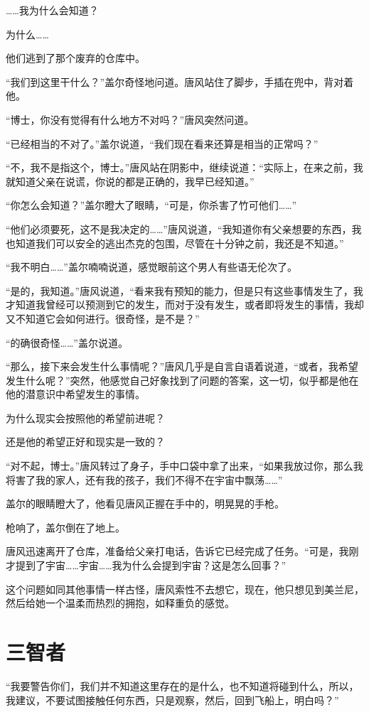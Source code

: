 ……我为什么会知道？ 

为什么…… 

他们逃到了那个废弃的仓库中。 

“我们到这里干什么？”盖尔奇怪地问道。唐风站住了脚步，手插在兜中，背对着他。 

“博士，你没有觉得有什么地方不对吗？”唐风突然问道。 

“已经相当的不对了。”盖尔说道，“我们现在看来还算是相当的正常吗？” 

“不，我不是指这个，博士。”唐风站在阴影中，继续说道：“实际上，在来之前，我就知道父亲在说谎，你说的都是正确的，我早已经知道。” 

“你怎么会知道？”盖尔瞪大了眼睛，“可是，你杀害了竹可他们……” 

“他们必须要死，这不是我决定的……”唐风说道，“我知道你有父亲想要的东西，我也知道我们可以安全的逃出杰克的包围，尽管在十分钟之前，我还是不知道。” 

“我不明白……”盖尔喃喃说道，感觉眼前这个男人有些语无伦次了。 

“是的，我知道。”唐风说道，“看来我有预知的能力，但是只有这些事情发生了，我才知道我曾经可以预测到它的发生，而对于没有发生，或者即将发生的事情，我却又不知道它会如何进行。很奇怪，是不是？” 

“的确很奇怪……”盖尔说道。 

“那么，接下来会发生什么事情呢？”唐风几乎是自言自语着说道，“或者，我希望发生什么呢？”突然，他感觉自己好象找到了问题的答案，这一切，似乎都是他在他的潜意识中希望发生的事情。 

为什么现实会按照他的希望前进呢？ 

还是他的希望正好和现实是一致的？ 

“对不起，博士。”唐风转过了身子，手中口袋中拿了出来，“如果我放过你，那么我将害了我的家人，还有我的孩子，我们不得不在宇宙中飘荡……” 

盖尔的眼睛瞪大了，他看见唐风正握在手中的，明晃晃的手枪。 

枪响了，盖尔倒在了地上。 

唐风迅速离开了仓库，准备给父亲打电话，告诉它已经完成了任务。“可是，我刚才提到了宇宙……宇宙……我为什么会提到宇宙？这是怎么回事？” 

这个问题如同其他事情一样古怪，唐风索性不去想它，现在，他只想见到美兰尼，然后给她一个温柔而热烈的拥抱，如释重负的感觉。 

\chapter{三智者}

“我要警告你们，我们并不知道这里存在的是什么，也不知道将碰到什么，所以，我建议，不要试图接触任何东西，只是观察，然后，回到飞船上，明白吗？” 


